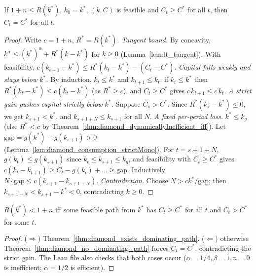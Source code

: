 \begin{theorem}
\label{thm:diamond_no_dominating_path}
\leanok
{}
If $1 + n \le R(k^*)$, $k_0 = k^*$, $(k, C)$ is feasible and $C_t \ge C^*$ for all $t$, then $C_t = C^*$ for all $t$.
\end{theorem}
\begin{proof}
\leanok
Write $c = 1 + n$, $R^* = R(k^*)$.
\emph{Tangent bound.} By concavity, $k^\alpha \le (k^*)^\alpha + R^*(k - k^*)$ for $k \ge 0$
(Lemma~\ref{lem:lt_tangent}). With feasibility,
$c(k_{t+1} - k^*) \le R^*(k_t - k^*) - (C_t - C^*)$.
\emph{Capital falls weakly and stays below $k^*$.} By induction, $k_t \le k^*$ and $k_{t+1} \le k_t$: if
$k_t \le k^*$ then $R^*(k_t - k^*) \le c(k_t - k^*)$ (as $R^* \ge c$), and $C_t \ge C^*$ gives
$c\, k_{t+1} \le c\, k_t$.
\emph{A strict gain pushes capital strictly below $k^*$.} Suppose $C_s > C^*$. Since $R^*(k_s - k^*) \le 0$,
we get $k_{s+1} < k^*$, and $k_{s+1+N} \le k_{s+1}$ for all $N$.
\emph{A fixed per-period loss.} $k^* \le k_g$ (else $R^* < c$ by Theorem~\ref{thm:diamond_dynamicallyInefficient_iff}).
Let $\mathrm{gap} = g(k^*) - g(k_{s+1}) > 0$ (Lemma~\ref{lem:diamond_consumption_strictMono}). For
$t = s + 1 + N$, $g(k_t) \le g(k_{s+1})$ since $k_t \le k_{s+1} \le k_g$, and feasibility with $C_t \ge C^*$
gives $c(k_t - k_{t+1}) \ge C_t - g(k_t) + \ldots \ge \mathrm{gap}$. Inductively
$N \cdot \mathrm{gap} \le c(k_{s+1} - k_{s+1+N})$.
\emph{Contradiction.} Choose $N > c k^*/\mathrm{gap}$; then $k_{s+1+N} < k_{s+1} - k^* < 0$, contradicting $k \ge 0$.
\end{proof}

\begin{theorem}
\label{thm:diamond_iff_improvement}
\leanok
{}
$R(k^*) < 1 + n$ iff some feasible path from $k^*$ has $C_t \ge C^*$ for all $t$ and $C_t > C^*$ for some $t$.
\end{theorem}
\begin{proof}
\leanok
($\Rightarrow$) Theorem~\ref{thm:diamond_exists_dominating_path}. ($\Leftarrow$) otherwise
Theorem~\ref{thm:diamond_no_dominating_path} forces $C_t = C^*$, contradicting the strict gain. The Lean file
also checks that both cases occur ($\alpha = 1/4, \beta = 1, n = 0$ is inefficient; $\alpha = 1/2$ is efficient).
\end{proof}


